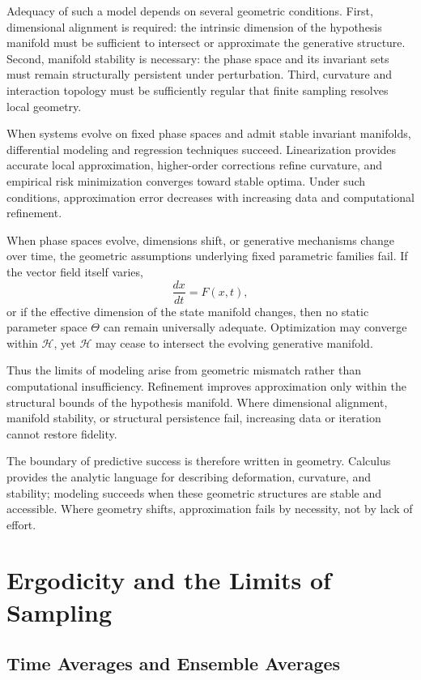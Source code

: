 \documentclass[12pt]{book}
\begin{document}
Adequacy of such a model depends on several geometric conditions. First, dimensional alignment is required: the intrinsic dimension of the hypothesis manifold must be sufficient to intersect or approximate the generative structure. Second, manifold stability is necessary: the phase space and its invariant sets must remain structurally persistent under perturbation. Third, curvature and interaction topology must be sufficiently regular that finite sampling resolves local geometry.

When systems evolve on fixed phase spaces and admit stable invariant manifolds, differential modeling and regression techniques succeed. Linearization provides accurate local approximation, higher-order corrections refine curvature, and empirical risk minimization converges toward stable optima. Under such conditions, approximation error decreases with increasing data and computational refinement.

When phase spaces evolve, dimensions shift, or generative mechanisms change over time, the geometric assumptions underlying fixed parametric families fail. If the vector field itself varies,
\[
\frac{dx}{dt} = F(x,t),
\]
or if the effective dimension of the state manifold changes, then no static parameter space $\Theta$ can remain universally adequate. Optimization may converge within $\mathcal{H}$, yet $\mathcal{H}$ may cease to intersect the evolving generative manifold.

Thus the limits of modeling arise from geometric mismatch rather than computational insufficiency. Refinement improves approximation only within the structural bounds of the hypothesis manifold. Where dimensional alignment, manifold stability, or structural persistence fail, increasing data or iteration cannot restore fidelity.

The boundary of predictive success is therefore written in geometry. Calculus provides the analytic language for describing deformation, curvature, and stability; modeling succeeds when these geometric structures are stable and accessible. Where geometry shifts, approximation fails by necessity, not by lack of effort.

\chapter{Ergodicity and the Limits of Sampling}

\section{Time Averages and Ensemble Averages}
\end{document}

